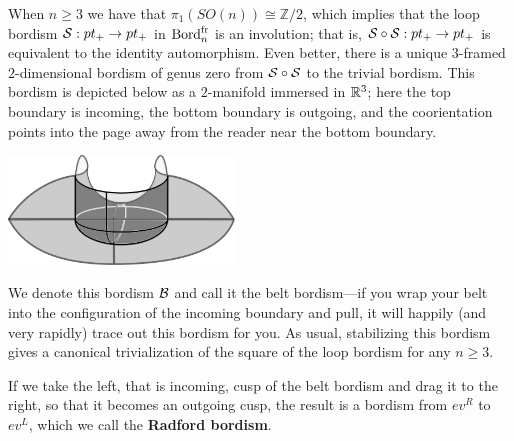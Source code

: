 \documentclass{amsart}
\begin{document}
When $n\geq 3$ we have that $\pi_1(SO(n)) \cong \mathbb{Z}/2$, which implies that the loop bordism $\mathcal S: pt_+ \rightarrow pt_+$ in $\mathrm{Bord}^\mathrm{fr}_n$ is an involution; that is, $\mathcal S \circ \mathcal S : pt_+ \rightarrow pt_+$ is equivalent to the identity automorphism. 
Even better, there is a unique $3$-framed $2$-dimensional bordism of genus zero from $\mathcal S \circ \mathcal S$ to the  trivial bordism. This bordism is depicted below as a $2$-manifold immersed in $\mathbb R^3$; here the top boundary is incoming, the bottom boundary is outgoing, and the coorientation points into the page away from the reader near the bottom boundary.
\begin{center}
\includegraphics[width=60mm]{cobordism.png}
\end{center}
\noindent We denote this bordism $\mathcal B$ and call it the belt bordism---if you wrap your belt into the configuration of the incoming boundary and pull, it will happily (and very rapidly) trace out this bordism for you. As usual, stabilizing this bordism gives a canonical trivialization of the square of the loop bordism for any $n \geq 3$.

If we take the left, that is incoming, cusp of the belt bordism and drag it to the right, so that it becomes an outgoing cusp, the result is a bordism from $ev^R$ to $ev^L$, which we call the {\bfseries Radford bordism}.
\begin{center}
\end{center}
\end{document}
